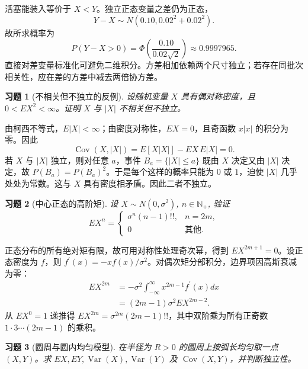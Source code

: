 \documentclass[12pt,fontset=fandol]{ctexart}
\newtheorem{exercise}{习题}[section]
\begin{document}
\begin{solve}\label{a:A5.30}活塞能装入等价于 $X<Y$。独立正态变量之差仍为正态，\[Y-X\sim N(0.10,0.02^2+0.02^2).\]故所求概率为\[P(Y-X>0)=\Phi\left(\frac{0.10}{0.02\sqrt2}\right)\approx0.9997965.\]直接对差变量标准化可避免二维积分。方差相加依赖两个尺寸独立；若存在同批次相关性，应在差的方差中减去两倍协方差。\end{solve}

\begin{exercise}[不相关但不独立的反例]\label{q:A5.32}
设随机变量 $X$ 具有偶对称密度，且 $0<EX^2<\infty$。证明 $X$ 与 $|X|$ 不相关但不独立。\par{}
\end{exercise}

\begin{solve}\label{a:A5.32}由柯西不等式，$E|X|<\infty$；由密度对称性，$EX=0$，且奇函数 $x|x|$ 的积分为零。因此\[\operatorname{Cov}(X,|X|)=E[X|X|]-EX\,E|X|=0.\]若 $X$ 与 $|X|$ 独立，则对任意 $a$，事件 $B_a=\{|X|\le a\}$ 既由 $X$ 决定又由 $|X|$ 决定，故 $P(B_a)=P(B_a)^2$。于是每个这样的概率只能为 $0$ 或 $1$，迫使 $|X|$ 几乎处处为常数。这与 $X$ 具有密度相矛盾。因此二者不独立。\end{solve}

\begin{exercise}[中心正态的高阶矩]\label{q:A5.33}
设 $X\sim N(0,\sigma^2)$, $n\in\mathbb{N}_+$, 验证
    \[EX^n=\begin{cases}
        \sigma^n(n-1)!!, & n=2m, \\
        0 & \text{其他}.
    \end{cases}\]\par{}
\end{exercise}

\begin{solve}\label{a:A5.33}正态分布的所有绝对矩有限，故可用对称性处理奇次幂，得到 $EX^{2m+1}=0$。设正态密度为 $f$，则 $f^{\prime}(x)=-xf(x)/\sigma^2$。对偶次矩分部积分，边界项因高斯衰减为零：\[\begin{aligned}EX^{2m}&=-\sigma^2\int_{-\infty}^{\infty}x^{2m-1}f^{\prime}(x)dx\\&=(2m-1)\sigma^2EX^{2m-2}.\end{aligned}\]从 $EX^0=1$ 递推得 $EX^{2m}=\sigma^{2m}(2m-1)!!$，其中双阶乘为所有正奇数 $1\cdot3\cdots(2m-1)$ 的乘积。\end{solve}

\begin{exercise}[圆周与圆内均匀模型]\label{q:A5.35}
在半径为 $R>0$ 的圆周上按弧长均匀取一点 $(X,Y)$。求 $EX,EY,\operatorname{Var}(X),\operatorname{Var}(Y)$ 及 $\operatorname{Cov}(X,Y)$，并判断独立性。\par{}
\end{exercise}
\end{document}
